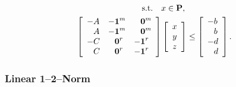 \documentclass{article}
\begin{document}
    \begin{align*}
        \st\quad &x\in\poly,
        \\
        \left[\begin{array}{lll}
                -A
            &
                -\ones^m
            &
            \minus\zeros^{m}
            \\
                \minus A
            &
                -\ones^m
            &
            \minus\zeros^{m}
            \\
            -C
            &
            \minus\zeros^{r}
            &
            -\ones^r
            \\
                \minus C
            &
            \minus\zeros^{r}
            &
                -\ones^r                
        \end{array}\right]
        &
        \left[\begin{array}{c}
            x   \\
            y \\
            z
        \end{array}\right]
        \leq
        \left[\begin{array}{l}
            -b                \\
            \minus b \\
            -d \\
            \minus d
        \end{array}\right].
    \end{align*}

\subsubsection{Linear 1--2--Norm}
\end{document}
